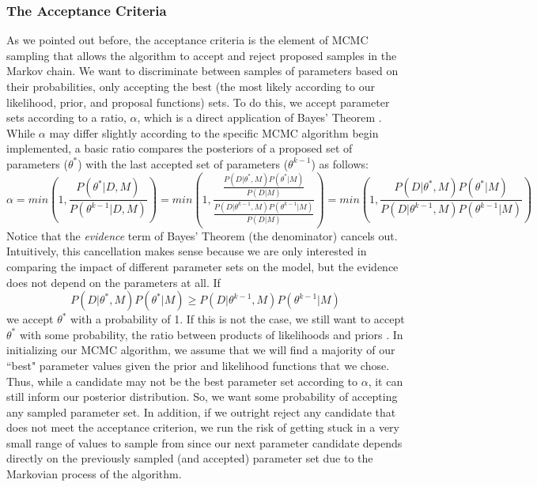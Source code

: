 \documentclass{article}
\begin{document}
\subsubsection{The Acceptance Criteria} As we pointed out before, the acceptance criteria is the element of MCMC sampling that allows the algorithm to accept and reject proposed samples in the Markov chain. We want to discriminate between samples of parameters based on their probabilities, only accepting the best (the most likely according to our likelihood, prior, and proposal functions) sets. To do this, we accept parameter sets according to a ratio, $\alpha$, which is a direct application of Bayes' Theorem \cite{astrostats}. While $\alpha$ may differ slightly according to the specific MCMC algorithm begin implemented, a basic ratio compares the posteriors of a proposed set of parameters ($\theta^*$) with the last accepted set of parameters ($\theta^{k-1}$) as follows:
\begin{equation} \label{eq:9mcmc}
\alpha = min(1, \frac{P(\theta^*|D, M)}{P(\theta^{k-1}|D,M)}) = min(1, \frac{\frac{P(D|\theta^*, M)P(\theta^*|M)}{P(D|M)}}{\frac{P(D|\theta^{k-1}, M)P(\theta^{k-1}|M)}{P(D|M)}}) = min(1, \frac{P(D|\theta^*, M)P(\theta^*|M)}{P(D|\theta^{k-1}, M)P(\theta^{k-1}|M)})
\end{equation}
Notice that the \emph{evidence} term of Bayes' Theorem (the denominator) cancels out. Intuitively, this cancellation makes sense because we are only interested in comparing the impact of different parameter sets on the model, but the evidence does not depend on the parameters at all. If 
\begin{equation} \label{eq:10mcmc}
P(D|\theta^*, M)P(\theta^*|M) \geq P(D|\theta^{k-1}, M)P(\theta^{k-1}|M)
\end{equation}
we accept $\theta^*$ with a probability of 1. If this is not the case, we still want to accept $\theta^*$ with some probability, the ratio between products of likelihoods and priors \cite{astrostats}. In initializing our MCMC algorithm, we assume that we will find a majority of our ``best" parameter values given the prior and likelihood functions that we chose. Thus, while a candidate may not be the best parameter set according to $\alpha$, it can still inform our posterior distribution. So, we want some probability of accepting any sampled parameter set. In addition, if we outright reject any candidate that does not meet the acceptance criterion, we run the risk of getting stuck in a very small range of values to sample from since our next parameter candidate depends directly on the previously sampled (and accepted) parameter set due to the Markovian process of the algorithm.
\end{document}
